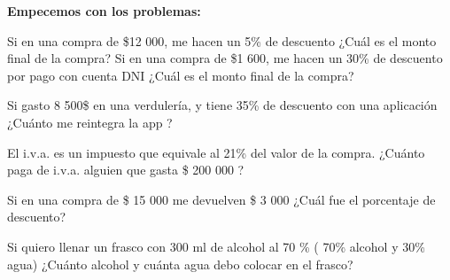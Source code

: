\documentclass[12pt]{exam}
\begin{document}
\begin{questions}
\begin{parts}
    \end{parts}
    
    \textbf{Empecemos con los problemas:}
        
        
        \question Si en una compra de \$12 000, me hacen un 5\% de descuento ¿Cuál es el monto final de la compra?
        \question Si en una compra de \$1 600, me hacen un 30\% de descuento por pago con cuenta DNI ¿Cuál es el monto final de la compra?
        
        \question Si gasto 8 500\$ en una verdulería, y tiene 35\% de descuento con una aplicación ¿Cuánto
                  me reintegra la app ?  
        
 
        \question El i.v.a. es un impuesto que equivale al 21\% del valor de la compra. ¿Cuánto paga de i.v.a. 
                  alguien que gasta \$ 200 000 ?  
        
        \question Si en una compra de \$ 15 000 me devuelven \$ 3 000 ¿Cuál fue el porcentaje de descuento? 
        
        \question Si quiero llenar un frasco con 300 ml de alcohol al 70 \% ( 70\% alcohol y 30\% agua)
                  ¿Cuánto alcohol y cuánta agua debo colocar en el frasco? 
        

\end{questions}
\end{document}

